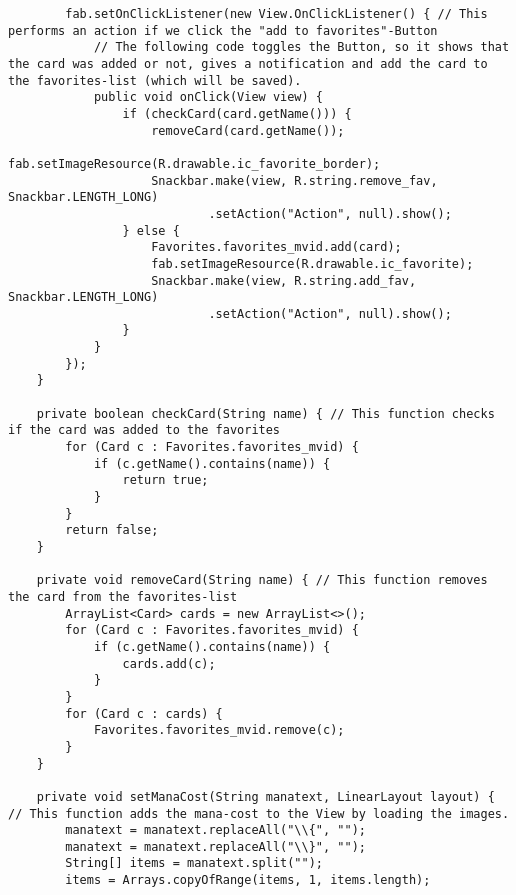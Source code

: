\begin{lstlisting}
        fab.setOnClickListener(new View.OnClickListener() { // This performs an action if we click the "add to favorites"-Button
            // The following code toggles the Button, so it shows that the card was added or not, gives a notification and add the card to the favorites-list (which will be saved).
            public void onClick(View view) {
                if (checkCard(card.getName())) {
                    removeCard(card.getName());
                    fab.setImageResource(R.drawable.ic_favorite_border);
                    Snackbar.make(view, R.string.remove_fav, Snackbar.LENGTH_LONG)
                            .setAction("Action", null).show();
                } else {
                    Favorites.favorites_mvid.add(card);
                    fab.setImageResource(R.drawable.ic_favorite);
                    Snackbar.make(view, R.string.add_fav, Snackbar.LENGTH_LONG)
                            .setAction("Action", null).show();
                }
            }
        });
    }

    private boolean checkCard(String name) { // This function checks if the card was added to the favorites
        for (Card c : Favorites.favorites_mvid) {
            if (c.getName().contains(name)) {
                return true;
            }
        }
        return false;
    }

    private void removeCard(String name) { // This function removes the card from the favorites-list
        ArrayList<Card> cards = new ArrayList<>();
        for (Card c : Favorites.favorites_mvid) {
            if (c.getName().contains(name)) {
                cards.add(c);
            }
        }
        for (Card c : cards) {
            Favorites.favorites_mvid.remove(c);
        }
    }

    private void setManaCost(String manatext, LinearLayout layout) { // This function adds the mana-cost to the View by loading the images.
        manatext = manatext.replaceAll("\\{", "");
        manatext = manatext.replaceAll("\\}", "");
        String[] items = manatext.split("");
        items = Arrays.copyOfRange(items, 1, items.length);


\end{lstlisting}

